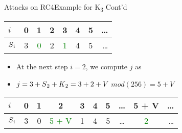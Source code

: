 \documentclass[
	aspectratio=169,	%
	onlytextwidth,		%
	t,					%
	]{beamer}
\begin{document}
\begin{frame}[fragile]{Attacks on RC4}{Example for K\textsubscript{3} Cont'd}

	\begin{table}[h!]
		\begin{center}
			\begin{tabular}{l|c|c|c|c|c|c|r}
			$i$ & 0 & 1 & 2 & 3 & 4 & 5 & \dots\\
			\hline
			$S\textsubscript{i}$ & 3 & \textcolor{green}{0} & 2 & \textcolor{green}{1} & 4 & 5 & \dots\\
			\end{tabular}
		\end{center}
	\end{table}

	\begin{itemize}
		\item At the next step $i = 2$, we compute $j$ as
		\item $j = 3 + S\textsubscript{2} + K\textsubscript{2} = 3 + 2 + V$ $mod(256) = 5+V$
	\end{itemize}

	\begin{table}[h!]
		\begin{center}
			\begin{tabular}{l|c|c|c|c|c|c|c|c|r}
			$i$ & 0 & 1 & 2 & 3 & 4 & 5 & \dots & 5 + V & \dots\\
			\hline
			$S\textsubscript{i}$ & 3 & 0 & \textcolor{green}{5 + V} & 1 & 4 & 5 & \dots & \textcolor{green}{2} & \dots\\
			\end{tabular}
		\end{center}
	\end{table}

\end{frame}
\end{document}
